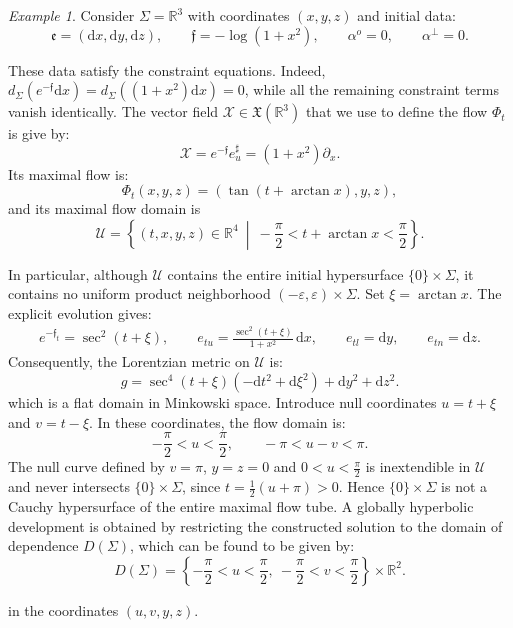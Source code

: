 \documentclass[10pt,reqno,a4paper]{amsart}
\theoremstyle{plain}
\theoremstyle{definition}
\theoremstyle{remark}
\theoremstyle{remark}
\newtheorem{ep}[thm]{Example}
\def\dd{\mathrm{d}}
\def\cX{\mathcal{X}}
\def\cU{\mathcal{U}}
\def\fre{\mathfrak{e}}
\renewcommand{\(}{ (}
\renewcommand{\)}{ )}
\newcommand{\frf}{\mathfrak{f}}
\begin{document}
\begin{ep} 
Consider $\Sigma=\mathbb{R}^3$ with coordinates $(x,y,z)$ and initial data:
\begin{equation*}
\fre = (\dd x,\dd y,\dd z), \qquad \frf=-\log(1+x^2), \qquad \alpha^o=0, \qquad \alpha^\perp=0.
\end{equation*}

\noindent
These data satisfy the constraint equations. Indeed, $d_\Sigma(e^{-\frf}\dd x)=d_\Sigma((1+x^2)\dd x)=0$, while all the
remaining constraint terms vanish identically. The vector field $\cX \in \mathfrak{X}(\mathbb{R}^3)$ that we use to define the flow $\Phi_t$ is give by:
\begin{equation*}
\cX=e^{-\frf}e_u^\sharp=(1+x^2)\partial_x.
\end{equation*}
Its maximal flow is:
\begin{equation*}
\Phi_t(x,y,z) = (\tan(t+\arctan x),y,z),
\end{equation*}
and its maximal flow domain is
\begin{equation*}
\cU = \left\{ (t,x,y,z)\in\mathbb{R}^4 \ \middle|\ -\frac{\pi}{2}<t+\arctan x<\frac{\pi}{2} \right\}.
\end{equation*}

\noindent
In particular, although $\cU$ contains the entire initial hypersurface $\{0\}\times\Sigma$, it contains no uniform product neighborhood $(-\varepsilon,\varepsilon)\times\Sigma$. Set $\xi=\arctan x$. The explicit evolution gives:
\begin{eqnarray*}
e^{-\frf_t}=\sec^2(t+\xi), \qquad e_{tu} = \frac{\sec^2(t+\xi)}{1+x^2}\,\dd x, \qquad e_{tl}=\dd y, \qquad e_{tn}=\dd z.
\end{eqnarray*}
Consequently, the Lorentzian metric on $\cU$ is:
\begin{equation*}
g = \sec^4(t+\xi)(-\dd t^2+\dd\xi^2 ) + \dd y^2 + \dd z^2.
\end{equation*}
which is a flat domain in Minkowski space. Introduce null coordinates $u=t+\xi$ and $v=t-\xi$. In these coordinates,
the flow domain is:
\begin{equation*}
-\frac{\pi}{2}<u<\frac{\pi}{2}, \qquad -\pi<u-v<\pi .
\end{equation*}
The null curve defined by $v=\pi$, $y=z=0$ and $0<u<\frac{\pi}{2}$ is inextendible in $\cU$ and never intersects $\{0\}\times\Sigma$, since $t=\frac{1}{2}(u+\pi)>0$. Hence $\{0\}\times\Sigma$ is not a Cauchy hypersurface of the entire maximal flow tube. A globally hyperbolic development is obtained by restricting the constructed solution to the domain of dependence $D(\Sigma)$, which can be found to be given by:
\begin{equation*}
D(\Sigma) = \left\{ -\frac{\pi}{2}<u<\frac{\pi}{2},\ -\frac{\pi}{2}<v<\frac{\pi}{2} \right\}\times\mathbb R^2.   
\end{equation*}

\noindent
in the coordinates $(u,v,y,z)$.
\end{ep} 
\end{document}
